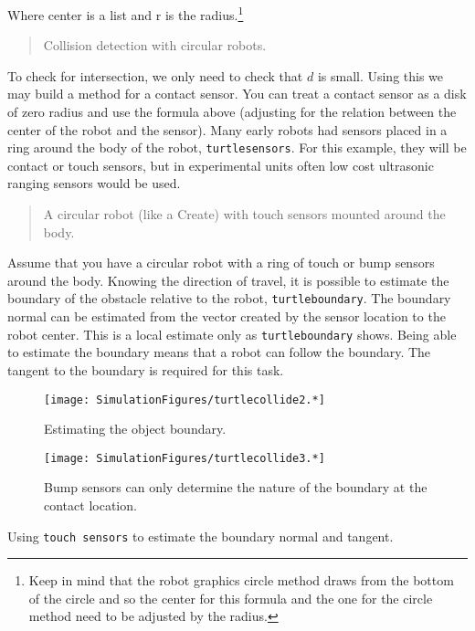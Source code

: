 Where center is a list and r is the radius.\footnote{Keep in mind that
  the robot graphics circle method draws from the bottom of the circle
  and so the center for this formula and the one for the circle method
  need to be adjusted by the radius.}

\begin{quote}
Collision detection with circular robots.
\end{quote}

To check for intersection, we only need to check that \(d\) is small.
Using this we may build a method for a contact sensor. You can treat a
contact sensor as a disk of zero radius and use the formula above
(adjusting for the relation between the center of the robot and the
sensor). Many early robots had sensors placed in a ring around the body
of the robot, \texttt{turtlesensors}. For this example, they will be
contact or touch sensors, but in experimental units often low cost
ultrasonic ranging sensors would be used.

\begin{quote}
A circular robot (like a Create) with touch sensors mounted around the
body.
\end{quote}

Assume that you have a circular robot with a ring of touch or bump
sensors around the body. Knowing the direction of travel, it is possible
to estimate the boundary of the obstacle relative to the robot,
\texttt{turtleboundary}. The boundary normal can be estimated from the
vector created by the sensor location to the robot center. This is a
local estimate only as \texttt{turtleboundary} shows. Being able to
estimate the boundary means that a robot can follow the boundary. The
tangent to the boundary is required for this task.

\begin{figure}
\centering
\texttt{[image: SimulationFigures/turtlecollide2.*]}
\caption{Estimating the object boundary.}
\end{figure}

\begin{figure}
\centering
\texttt{[image: SimulationFigures/turtlecollide3.*]}
\caption{Bump sensors can only determine the nature of the boundary at
the contact location.}
\end{figure}

Using \texttt{touch\ sensors} to estimate the boundary normal and
tangent.

